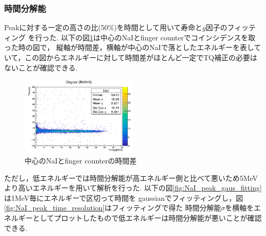 
\subsubsection{時間分解能}
Peakに対する一定の高さの比(50\%)を時間として用いて寿命と$g$因子のフィッティング
を行った.
以下の図\ref{fig:Original}は中心のNaIとfinger counterでコインシデンスを取った時の図で， 縦軸が時間差，横軸が中心のNaIで落としたエネルギーを表していて，この図からエネルギーに対して時間差がほとんど一定でTQ補正の必要はないことが確認できる.

\begin{figure}[H]%
  \centering
  \includegraphics[width  = 0.5\textwidth]{figure/mino/Original.png}
  \caption{中心のNaIとfinger counterの時間差}
  \label{fig:Original}
\end{figure}

ただし，低エネルギーでは時間分解能が高エネルギー側と比べて悪いため5MeVより高いエネルギーを用いて解析を行った.
以下の図\ref{fig:NaI_peak_gaus_fitting}は1MeV毎にエネルギーで区切って時間を
gaussianでフィッティングし，図\ref{fig:NaI_peak_time_resolution}はフィッティングで得た
時間分解能$\sigma$を横軸をエネルギーとしてプロットしたもので低エネルギーは時間分解能が悪いことが確認できる.

